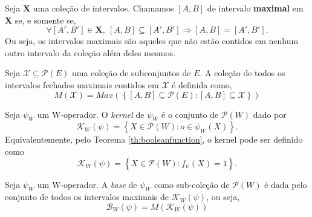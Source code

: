 \begin{definition} 
        Seja $\textbf{X}$ uma coleção de intervalos. Chamamos $\left[A,B \right]$ de intervalo \textbf{maximal} em \textbf{X} se, e somente se,
        $$\forall \left[A',B' \right] \in \textbf{X}, \ \left[ A,B \right] \subseteq \left[A',B' \right] \Rightarrow \left[ A,B \right] = \left[ A',B' \right]. $$
        Ou seja, os intervalos maximais são aqueles que não estão contidos em nenhum outro intervalo da coleção além deles mesmos.
\end{definition}

\begin{definition} 
        Seja $\mathcal{X} \subseteq \mathcal{P}(E)$ uma coleção de subconjuntos de $E$. A coleção de todos os intervalos fechados maximais contidos em $\mathcal{X}$ é definida como,
        $$M \left( \mathcal{X} \right) = Max \left( \left\{ \left[A,B \right] \subseteq \mathcal{P}\left(E\right): \left[A,B \right] \subseteq \mathcal{X} \right\} \right)$$
\end{definition}

\begin{definition} 
        Seja $\psi_{W}$ um W-operador. O \textit{kernel} de $\psi_{W}$ é o conjunto de $\mathcal{P} \left( W \right)$ dado por
        $$\mathcal{K}_{W} \left( \psi \right) = \left\{ X \in \mathcal{P} \left( W \right): o \in \psi_{W} \left( X \right) \right\}. $$
        Equivalentemente, pelo Teorema \ref{th:booleanfunction}, o kernel pode ser definido como
        \begin{equation}
            \label{kernel_pela_fc}
            \mathcal{K}_{W} \left( \psi \right) = \left\{ X \in \mathcal{P} \left( W \right): f_{\psi}(X) = 1\right\}.
        \end{equation}
\end{definition}

\begin{definition} 
        \label{def_base}
        Seja $\psi_{W}$ um W-operador. A \textit{base} de $\psi_{W}$ como sub-coleção de $\mathcal{P} \left( W \right)$ é dada pelo conjunto de todos os intervalos maximais de $\mathcal{K}_{W} \left( \psi \right)$, ou seja, 
        $$\mathcal{B}_{W} \left( \psi \right) = M \left( \mathcal{K}_{W} \left( \psi \right)  \right) $$
\end{definition}

